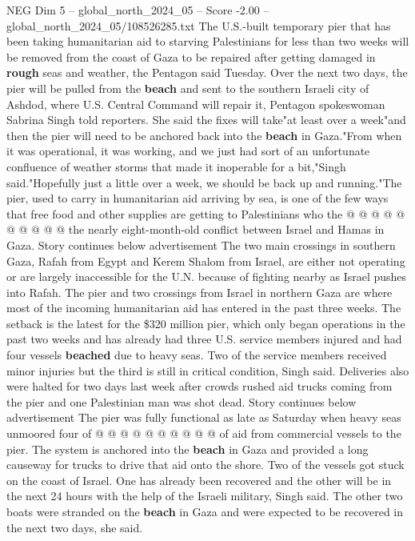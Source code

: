 \begin{textsample}{NEG Dim 5 – global\_north\_2024\_05 – Score -2.00 – global\_north\_2024\_05/108526285.txt}  \label{ex:f5_neg_285}
The U.S.-built temporary pier that has been taking humanitarian aid to starving Palestinians for less than two weeks will be removed from the coast of Gaza to be repaired after getting damaged in \textbf{rough} seas and weather, the Pentagon said Tuesday.
Over the next two days, the pier will be pulled from the \textbf{beach} and sent to the southern Israeli city of Ashdod, where U.S.
Central Command will repair it, Pentagon spokeswoman Sabrina Singh told reporters.
She said the fixes will take"at least over a week"and then the pier will need to be anchored back into the \textbf{beach} in Gaza."From when it was operational, it was working, and we just had sort of an unfortunate confluence of weather storms that made it inoperable for a bit,"Singh said."Hopefully just a little over a week, we should be back up and running."The pier, used to carry in humanitarian aid arriving by sea, is one of the few ways that free food and other supplies are getting to Palestinians who the @ @ @ @ @ @ @ @ @ @ the nearly eight-month-old conflict between Israel and Hamas in Gaza.
Story continues below advertisement The two main crossings in southern Gaza, Rafah from Egypt and Kerem Shalom from Israel, are either not operating or are largely inaccessible for the U.N. because of fighting nearby as Israel pushes into Rafah.
The pier and two crossings from Israel in northern Gaza are where most of the incoming humanitarian aid has entered in the past three weeks.
The setback is the latest for the \$320 million pier, which only began operations in the past two weeks and has already had three U.S. service members injured and had four vessels \textbf{beached} due to heavy seas.
Two of the service members received minor injuries but the third is still in critical condition, Singh said.
Deliveries also were halted for two days last week after crowds rushed aid trucks coming from the pier and one Palestinian man was shot dead.
Story continues below advertisement The pier was fully functional as late as Saturday when heavy seas unmoored four of @ @ @ @ @ @ @ @ @ @ of aid from commercial vessels to the pier.
The system is anchored into the \textbf{beach} in Gaza and provided a long causeway for trucks to drive that aid onto the shore.
Two of the vessels got stuck on the coast of Israel.
One has already been recovered and the other will be in the next 24 hours with the help of the Israeli military, Singh said.
The other two boats were stranded on the \textbf{beach} in Gaza and were expected to be recovered in the next two days, she said.

\end{textsample}
